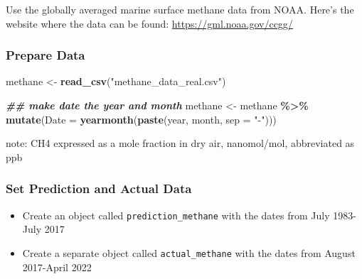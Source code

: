 \documentclass[
]{article}
\newenvironment{Shaded}{\begin{snugshade}}{\end{snugshade}}
\newcommand{\AttributeTok}[1]{\textcolor[rgb]{0.13,0.29,0.53}{#1}}
\newcommand{\DocumentationTok}[1]{\textcolor[rgb]{0.56,0.35,0.01}{\textbf{\textit{#1}}}}
\newcommand{\FunctionTok}[1]{\textcolor[rgb]{0.13,0.29,0.53}{\textbf{#1}}}
\newcommand{\NormalTok}[1]{#1}
\newcommand{\OtherTok}[1]{\textcolor[rgb]{0.56,0.35,0.01}{#1}}
\newcommand{\SpecialCharTok}[1]{\textcolor[rgb]{0.81,0.36,0.00}{\textbf{#1}}}
\newcommand{\StringTok}[1]{\textcolor[rgb]{0.31,0.60,0.02}{#1}}
\begin{document}
Use the globally averaged marine surface methane data from NOAA. Here's
the website where the data can be found:
\url{https://gml.noaa.gov/ccgg/}

\hypertarget{prepare-data}{%
\subsubsection{Prepare Data}\label{prepare-data}}

\begin{Shaded}
\begin{Highlighting}[]
\NormalTok{methane }\OtherTok{\textless{}{-}} \FunctionTok{read\_csv}\NormalTok{(}\StringTok{"methane\_data\_real.csv"}\NormalTok{)}

\DocumentationTok{\#\# make date the year and month }
\NormalTok{methane }\OtherTok{\textless{}{-}}\NormalTok{ methane }\SpecialCharTok{\%\textgreater{}\%}
  \FunctionTok{mutate}\NormalTok{(}\AttributeTok{Date =} \FunctionTok{yearmonth}\NormalTok{(}\FunctionTok{paste}\NormalTok{(year, month, }\AttributeTok{sep =} \StringTok{"{-}"}\NormalTok{)))}
\end{Highlighting}
\end{Shaded}

note: CH4 expressed as a mole fraction in dry air, nanomol/mol,
abbreviated as ppb

\hypertarget{set-prediction-and-actual-data}{%
\subsubsection{Set Prediction and Actual
Data}\label{set-prediction-and-actual-data}}

\begin{itemize}
\item
  Create an object called \texttt{prediction\_methane} with the dates
  from July 1983-July 2017
\item
  Create a separate object called \texttt{actual\_methane} with the
  dates from August 2017-April 2022
\end{itemize}
\end{document}
